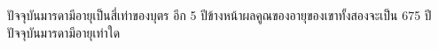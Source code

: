 ﻿%
\question ปัจจุบันมารดามีอายุเป็นสี่เท่าของบุตร อีก 5 ปีข้างหน้าผลคูณของอายุของเขาทั้งสองจะเป็น 675 ปี ปัจจุบันมารดามีอายุเท่าใด
\newline
{}

